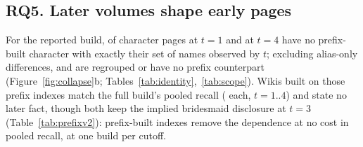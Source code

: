 \subsection{RQ5. Later volumes shape early pages}
\label{sec:results-scope}
For the reported build,  of character
pages at $t=1$ and  at $t=4$ have no prefix-built character with
exactly their set of names observed by $t$; excluding alias-only differences,
 and  are regrouped or have no prefix
counterpart (Figure~\ref{fig:collapse}b; Tables~\ref{tab:identity},~\ref{tab:scope}). Wikis built on those
prefix indexes match the full build's pooled recall ( each,
$t=1..4$) and state no later fact, though both keep the implied bridesmaid disclosure at
$t=3$ (Table~\ref{tab:prefixv2}): prefix-built indexes remove the dependence at no cost in
pooled recall, at one build per cutoff.
